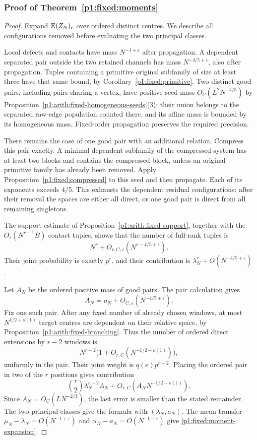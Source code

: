 \subsubsection{Proof of Theorem~\ref{p1:fixed:moments}}
\label{p14:comp:fixed-moments}

\begin{proof}
Expand \(\mathbb E(Z_N)_r\) over ordered distinct centres.
We describe all configurations removed before evaluating
the two principal classes.

Local defects and contacts have mass \(N^{-1+\varepsilon}\)
after propagation. A dependent separated pair outside
the two retained channels has mass
\(N^{-4/5+\varepsilon}\), also after propagation.
Tuples containing a primitive original subfamily of
size at least three have that same bound, by
Corollary~\ref{p1:fixed:primitive}.
Two distinct good pairs, including pairs sharing a vertex, have
positive seed mass $O_C(L^2N^{-4/3})$ by
Proposition~\ref{p1:arith:fixed-homogeneous-seeds}(3): their union
belongs to the separated raw-edge population counted there, and
its affine mass is bounded by its homogeneous mass. Fixed-order
propagation preserves the required precision.

There remains the case of one good pair with an
additional relation. Compress this pair exactly.
A minimal dependent subfamily of the compressed
system has at least two blocks and contains the
compressed block, unless an original primitive family
has already been removed. Apply
Proposition~\ref{p1:fixed:compressed} to this seed and
then propagate. Each of its exponents exceeds \(4/5\).
This exhausts the dependent residual configurations:
after their removal the spaces are either all direct,
or one good pair is direct from all remaining
singletons.

The support estimate
of Proposition~\ref{p1:arith:fixed-support}, together with
the \(O_r(N^{r-1}B)\) contact tuples, shows that the
number of full-rank tuples is
\[
 N^r+O_{r,C,\varepsilon}(N^{r-4/5+\varepsilon}).
\]
Their joint probability is exactly \(p^r\), and their
contribution is \(\lambda_N^r+O(N^{-4/5+\varepsilon})\).

Let \(A_N\) be the ordered positive mass of good pairs.
The pair calculation gives
\[
 A_N=a_N+O_{C,\varepsilon}(N^{-4/5+\varepsilon}).
\]
Fix one such pair. After any fixed number of already
chosen windows, at most \(N^{1/2+o(1)}\) target centres
are dependent on their relative space, by
Proposition~\ref{p1:arith:fixed-branching}. Thus the number of
ordered direct extensions by \(r-2\) windows is
\[
 N^{r-2}\bigl(1+O_{r,C}(N^{-1/2+o(1)})\bigr),
\]
uniformly in the pair. Their joint weight is
\(q(e)p^{r-2}\). Placing the ordered pair in two of
the \(r\) positions gives contribution
\[
 \binom r2\lambda_N^{r-2}A_N
       +O_{r,C}(A_NN^{-1/2+o(1)}).
\]
Since \(A_N=O_C(LN^{-2/3})\), the last error is
smaller than the stated remainder. The two principal
classes give the formula with \((\lambda_N,a_N)\).
The mean transfer
\(\mu_N-\lambda_N=O(N^{-1+\varepsilon})\) and
\(\alpha_N-a_N=O(N^{-1+\varepsilon})\) give
\eqref{p1:fixed:moment-expansion}.


\end{proof}
